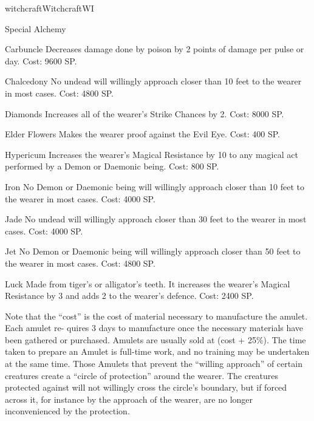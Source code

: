 \begin{College}[1.1]{witchcraft}{Witchcraft}{WI}
\begin{talent}[T-2]{Special Alchemy}
\begin{effects}
\begin{Description}
\begin{Description}
\item[Carbuncle] Decreases damage done by poison by 2 points of damage
  per pulse or day. Cost: 9600 SP.

\item[Chalcedony] No undead will willingly approach closer than 10
  feet to the wearer in most cases.  Cost: 4800 SP.

\item[Diamonds] Increases all of the wearer’s Strike Chances by
  2. Cost: 8000 SP.

\item[Elder Flowers] Makes the wearer proof against the Evil
  Eye. Cost: 400 SP.

\item[Hypericum] Increases the wearer’s Magical Resistance by 10 to
  any magical act performed by a Demon or Daemonic being. Cost: 800
  SP.

\item[Iron] No Demon or Daemonic being will willingly approach closer
  than 10 feet to the wearer in most cases. Cost: 4000 SP.

\item[Jade] No undead will willingly approach closer than 30 feet to
  the wearer in most cases. Cost: 4000 SP.

\item[Jet] No Demon or Daemonic being will willingly approach closer
  than 50 feet to the wearer in most cases. Cost: 4800 SP.

\item[Luck] Made from tiger’s or alligator’s teeth.  It increases the
  wearer’s Magical Resistance by 3 and adds 2 to the wearer’s
  defence. Cost: 2400 SP.
\end{Description}
Note that the “cost” is the cost of material necessary to manufacture
the amulet.  Each amulet re- quires 3 days to manufacture once the
necessary materials have been gathered or purchased.  Amulets are
usually sold at (cost + 25\%).  The time taken to prepare an Amulet is
full-time work, and no training may be undertaken at the same time.
Those Amulets that prevent the “willing approach” of certain creatures
create a “circle of protection” around the wearer. The creatures
protected against will not willingly cross the circle’s boundary, but
if forced across it, for instance by the approach of the wearer, are
no longer inconvenienced by the protection.


\end{Description}
\end{effects}
\end{talent}
\end{College}
